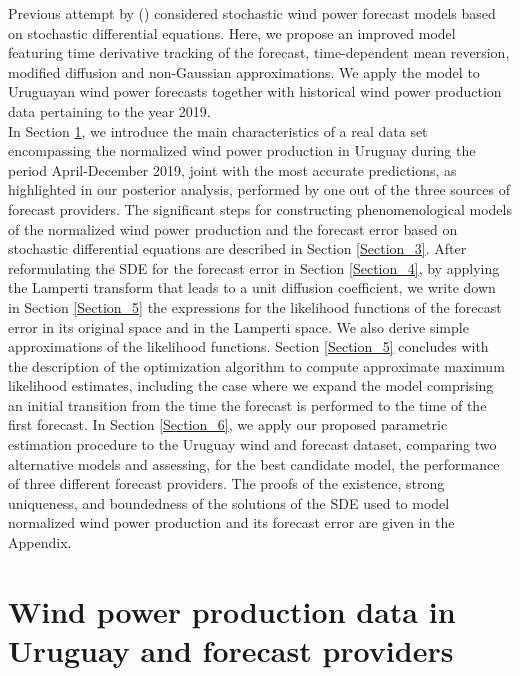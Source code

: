 \documentclass[11pt]{article}
\theoremstyle{definition}
\begin{document}
Previous attempt by (\cite{mozuma}) considered stochastic wind power forecast models based on stochastic differential equations. Here, we propose an improved model featuring time derivative tracking of the forecast, time-dependent mean reversion, modified diffusion and non-Gaussian approximations. We apply the model to Uruguayan wind power forecasts together with historical wind power production data pertaining to the year 2019. \\

In Section \ref{Section_2}, we introduce the main characteristics of a real data set encompassing the normalized wind power production in Uruguay during the period April-December 2019, joint with the most accurate predictions, as highlighted in our posterior analysis, performed by one out of the three sources of forecast providers. The significant steps for constructing phenomenological models of the normalized wind power production and the forecast error based on stochastic differential equations are described in Section \ref{Section_3}. After reformulating the SDE for the forecast error in Section \ref{Section_4}, by applying the Lamperti transform that leads to a unit diffusion coefficient, we write down in Section \ref{Section_5} the expressions for the likelihood functions of the forecast error in its original space and in the Lamperti space. We also derive simple approximations of the likelihood functions. Section \ref{Section_5} concludes with the description of the optimization algorithm to compute approximate maximum likelihood estimates, including the case where we expand the model comprising an initial transition from the time the forecast is performed to the time of the first forecast.  
In Section \ref{Section_6}, we apply our proposed parametric estimation procedure to the Uruguay wind and forecast dataset, comparing two alternative models and assessing, for the best candidate model, the performance of three different forecast providers.
The proofs of the existence, strong uniqueness, and boundedness of the solutions of the SDE used to model normalized wind power production and its forecast error are given in the Appendix.



\section{Wind power production data in Uruguay and forecast providers } \label{Section_2}
\end{document}
